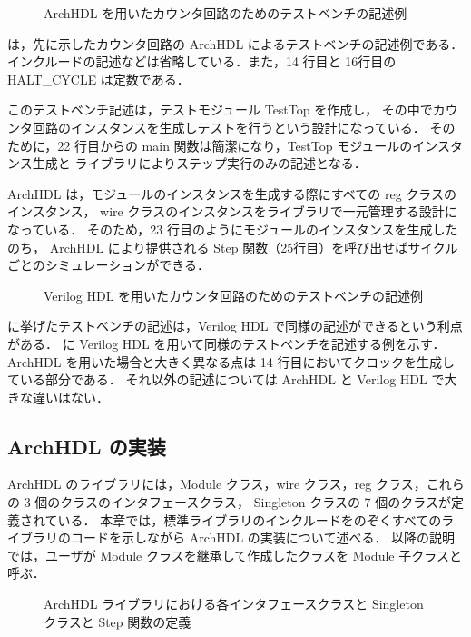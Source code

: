 \begin{figure}[t]
 
 \caption{ArchHDL を用いたカウンタ回路のためのテストベンチの記述例}
 \label{src:test}
\end{figure}

 は，先に示したカウンタ回路の ArchHDL によるテストベンチの記述例である．
インクルードの記述などは省略している．また，14 行目と 16行目の HALT\_CYCLE は定数である．

このテストベンチ記述は，テストモジュール TestTop を作成し，
その中でカウンタ回路のインスタンスを生成しテストを行うという設計になっている．
そのために，22 行目からの main 関数は簡潔になり，TestTop モジュールのインスタンス生成と
ライブラリによりステップ実行のみの記述となる．

ArchHDL は，モジュールのインスタンスを生成する際にすべての reg クラスのインスタンス，
wire クラスのインスタンスをライブラリで一元管理する設計になっている．
そのため，23 行目のようにモジュールのインスタンスを生成したのち，
ArchHDL により提供される Step 関数（25行目）を呼び出せばサイクルごとのシミュレーションができる．

\begin{figure}[t]
 
 \caption{Verilog HDL を用いたカウンタ回路のためのテストベンチの記述例}
 \label{src:test_v}
\end{figure}

 に挙げたテストベンチの記述は，Verilog HDL で同様の記述ができるという利点がある．
 に Verilog HDL を用いて同様のテストベンチを記述する例を示す．
ArchHDL を用いた場合と大きく異なる点は 14 行目においてクロックを生成している部分である．
それ以外の記述については ArchHDL と Verilog HDL で大きな違いはない．

\fi

\subsection{ArchHDL の実装} \label{ss:implementation}

ArchHDL のライブラリには，Module クラス，wire クラス，reg クラス，これらの 3 個のクラスのインタフェースクラス，
Singleton クラスの 7 個のクラスが定義されている．
本章では，標準ライブラリのインクルードをのぞくすべてのライブラリのコードを示しながら ArchHDL の実装について述べる．
以降の説明では，ユーザが Module クラスを継承して作成したクラスを Module 子クラスと呼ぶ．

\begin{figure}[t]
 
 \caption{ArchHDL ライブラリにおける各インタフェースクラスと Singleton クラスと Step 関数の定義}
 \label{src:class_singleton}
\end{figure}

